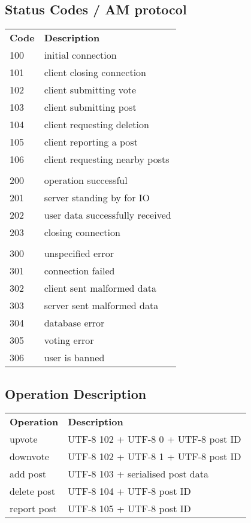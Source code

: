 \documentclass[12pt, a4paper]{article}
\begin{document}
\subsection{Status Codes / AM protocol}
\begin{table}[h]
\centering
\label{my-label}
\begin{tabular}{ll}
\textbf{Code} &\textbf{Description}\\
100 & initial connection\\
101 & client closing connection\\
102 & client submitting vote\\
103 & client submitting post\\
104 & client requesting deletion\\
105 & client reporting a post\\
106 & client requesting nearby posts\\
&\\
200 & operation successful\\
201 & server standing by for IO\\
202 & user data successfully received\\
203 & closing connection\\
&\\
300 & unspecified error\\
301 & connection failed\\
302 & client sent malformed data\\
303 & server sent malformed data\\
304 & database error\\
305 & voting error\\
306 & user is banned\\
\end{tabular}
\end{table}

\subsection{Operation Description}
\begin{table}[h]
\centering
\label{my-label}
\begin{tabular}{ll}
\textbf{Operation} &\textbf{Description}\\
upvote & UTF-8 102 + UTF-8 0 + UTF-8 post ID\\
downvote & UTF-8 102 + UTF-8 1 + UTF-8 post ID\\
add post & UTF-8 103 + serialised post data\\
delete post & UTF-8 104 + UTF-8 post ID\\
report post & UTF-8 105 + UTF-8 post ID\\
\end{tabular}
\end{table}
\end{document}
